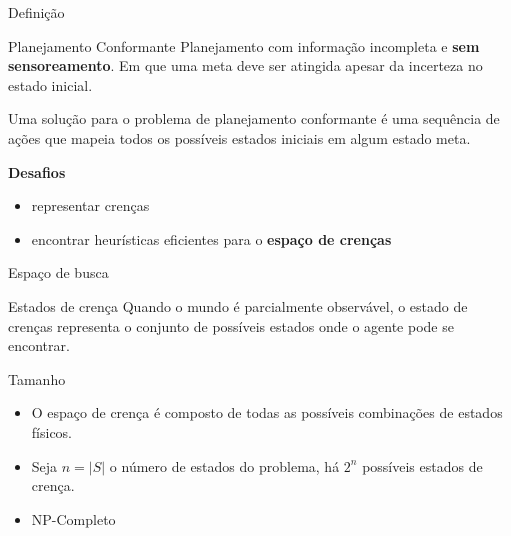 \begin{frame}{Definição}
    \begin{block}{Planejamento Conformante}
    {  Planejamento com informação incompleta e \textbf{sem sensoreamento}. Em 
    que uma meta deve ser atingida apesar da incerteza no estado inicial.}
    \end{block}

    { \small Uma solução para o problema de planejamento conformante é uma sequência de ações 
    que mapeia todos os possíveis estados iniciais em algum estado meta.} \\
    \pause
    \begin{block}{ \alert{\bf Desafios}}
        \begin{itemize}
         \item representar crenças
         \item encontrar heurísticas eficientes para o \textbf{espaço de crenças}
        \end{itemize}
    
    \end{block}

\end{frame}

\begin{frame}{Espaço de busca}
    \begin{block}{Estados de crença}
    { Quando o mundo é parcialmente observável, o estado de crenças 
representa o conjunto de possíveis estados onde o agente pode se encontrar. } \\
    \end{block}
    
    \begin{block}{Tamanho}
        \begin{itemize}
        \item O espaço de crença é composto de todas as possíveis combinações de 
    estados físicos.

        \item Seja $n = |S|$ o número de estados do problema, há $2^{\textit{n}}$ possíveis 
        estados de crença.\\
        
        \item NP-Completo
        \end{itemize}
    \end{block}
   
\end{frame}

